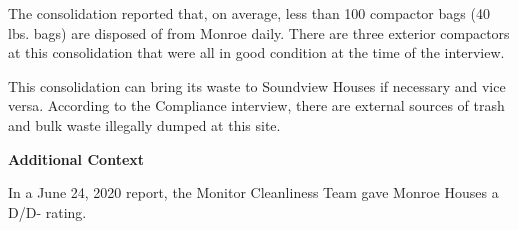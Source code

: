 The consolidation reported that, on average, less than 100 compactor bags (40 lbs. bags)  are disposed of from Monroe daily. There are three exterior compactors at this consolidation that were all in good condition at the time of the interview.  

This consolidation can bring its waste to Soundview Houses if necessary and vice versa. According to the Compliance interview, there are external sources of trash and bulk waste illegally dumped at this site. 

\textbf{Additional Context} 

In a June 24, 2020 report, the Monitor Cleanliness Team gave Monroe Houses a D/D- rating. 